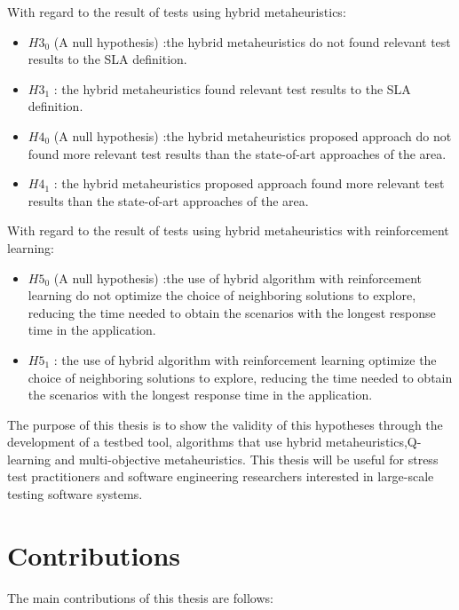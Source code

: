 \documentclass[espaco=umemeio,chapter=TITLE,twoside,openright]{abnt}
\begin{document}
With regard to the result of tests using hybrid metaheuristics:
\begin{itemize}
\item $H3_{0}$ (A null hypothesis) :the hybrid metaheuristics do not found relevant test results to the SLA definition.
\item $H3_{1}$  : the hybrid metaheuristics  found relevant test results to the SLA definition.
\end{itemize}


\begin{itemize}
\item $H4_{0}$ (A null hypothesis) :the hybrid metaheuristics proposed approach do not found more relevant test results than the state-of-art approaches of the area.
\item $H4_{1}$  : the hybrid metaheuristics  proposed approach found more relevant test results than the state-of-art approaches of the area.
\end{itemize}

With regard to the result of tests using hybrid metaheuristics with reinforcement learning:

\begin{itemize}
\item $H5_{0}$ (A null hypothesis) :the use of hybrid algorithm with reinforcement learning  do not optimize the choice of neighboring solutions to explore, reducing the time needed to obtain the scenarios with the longest response time in the application.
\item $H5_{1}$  : the use of hybrid algorithm with reinforcement learning optimize the choice of neighboring solutions to explore, reducing the time needed to obtain the scenarios with the longest response time in the application.
\end{itemize}




The purpose of this thesis is to show the validity of this hypotheses through the development of a testbed tool, algorithms that use hybrid metaheuristics,Q-learning and multi-objective metaheuristics. This thesis will be useful for stress test practitioners and software engineering researchers interested in large-scale testing software systems.


\section{Contributions}

The main contributions of this thesis are follows:
\end{document}
